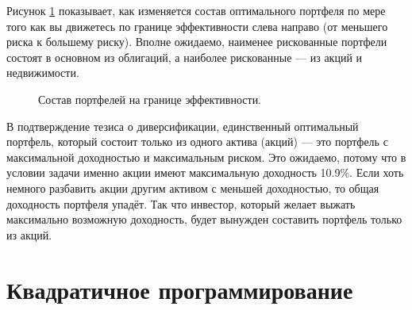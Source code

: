 Рисунок \ref{efficient_frontier_allocation} показывает, как изменяется состав оптимального портфеля по мере того как вы движетесь по границе эффективности слева направо (от меньшего риска к большему риску). Вполне ожидаемо, наименее рискованные портфели состоят в основном из облигаций, а наиболее рискованные --- из акций и недвижимости.

\begin{figure}[h!]
\centering
{}

\caption{Состав портфелей на границе эффективности.}
\label{efficient_frontier_allocation}
\end{figure}

В подтверждение тезиса о диверсификации, единственный оптимальный портфель, который состоит только из одного актива (акций) --- это портфель с максимальной доходностью и максимальным риском. Это ожидаемо, потому что в условии задачи именно акции имеют максимальную доходность 10.9\%. Если хоть немного разбавить акции другим активом с меньшей доходностью, то общая доходность портфеля упадёт. Так что инвестор, который желает выжать максимально возможную доходность, будет вынужден составить портфель только из акций.

\section{Квадратичное программирование}

